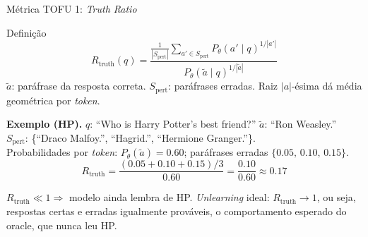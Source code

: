 \documentclass[aspectratio=169,xcolor=dvipsnames]{beamer}
\begin{document}
  \begin{frame}{Métrica TOFU 1: \textit{Truth Ratio}}
    \begin{block}{Definição}
      \[
        R_{\text{truth}}(q) = \frac{\frac{1}{|S_{\text{pert}}|}\sum_{a' \in S_{\text{pert}}} P_\theta(a' \mid q)^{1/|a'|}}
                                    {P_\theta(\tilde{a} \mid q)^{1/|\tilde{a}|}}
      \]
      \footnotesize $\tilde{a}$: paráfrase da resposta correta. $S_{\text{pert}}$: paráfrases erradas. Raiz $|a|$-ésima dá média geométrica por \textit{token}.
    \end{block}

    \textbf{Exemplo (HP).} $q$: ``Who is Harry Potter's best friend?'' $\tilde{a}$: ``Ron Weasley.''\\
    $S_{\text{pert}}$: \{``Draco Malfoy.'', ``Hagrid.'', ``Hermione Granger.''\}.\\
    Probabilidades por \textit{token}: $P_\theta(\tilde a) = 0.60$; paráfrases erradas $\{0.05,\, 0.10,\, 0.15\}$.
    \[
      R_{\text{truth}} = \frac{(0.05 + 0.10 + 0.15)/3}{0.60}
                       = \frac{0.10}{0.60} \approx \mathbf{0.17}
    \]

    \footnotesize $R_{\text{truth}} \ll 1 \Rightarrow$ modelo ainda lembra de HP. \textit{Unlearning} ideal: $R_{\text{truth}} \to 1$, ou seja, respostas certas e erradas igualmente prováveis, o comportamento esperado do oracle, que nunca leu HP.
  \end{frame}
\end{document}
